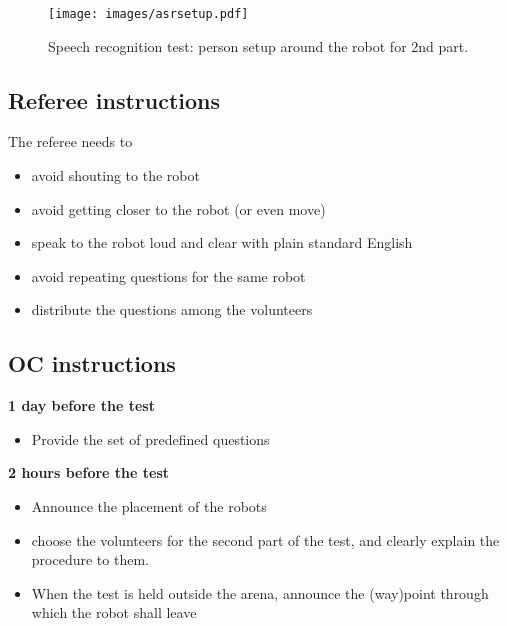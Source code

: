 \begin{figure}[!h]
	\centering
	\texttt{[image: images/asrsetup.pdf]}
	\caption{Speech recognition test: person setup around the robot for 2nd part.}
	\label{fig:asrsetup}
\end{figure}


\subsection{Referee instructions}

The referee needs to
\begin{itemize}
    \item avoid shouting to the robot
    \item avoid getting closer to the robot (or even move)
    \item speak to the robot loud and clear with plain standard English
    \item avoid repeating questions for the same robot
    \item distribute the questions among the volunteers
\end{itemize}

\subsection{OC instructions}

\textbf{1 day before the test}
\begin{itemize}
    \item Provide the set of predefined questions
\end{itemize}

\textbf{2 hours before the test}
\begin{itemize}
    \item Announce the placement of the robots
    \item choose the volunteers for the second part of the test, and clearly explain the procedure to them.
    \item When the test is held outside the arena, announce the (way)point through which the robot shall leave
\end{itemize}

